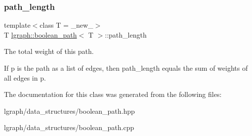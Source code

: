 \subsubsection{\texorpdfstring{path\+\_\+length}{path\_length}}
{\footnotesize\ttfamily template$<$class T = \+\_\+new\+\_\+$>$ \\
T \hyperlink{classlgraph_1_1boolean__path}{lgraph\+::boolean\+\_\+path}$<$ T $>$\+::path\+\_\+length\hspace{0.3cm}{\ttfamily [private]}}



The total weight of this path. 

If \textquotesingle{}p\textquotesingle{} is the path as a list of edges, then \textquotesingle{}path\+\_\+length\textquotesingle{} equals the sum of weights of all edges in \textquotesingle{}p\textquotesingle{}. 

The documentation for this class was generated from the following files\+:\begin{DoxyCompactItemize}
\item 
lgraph/data\+\_\+structures/boolean\+\_\+path.\+hpp\item 
lgraph/data\+\_\+structures/boolean\+\_\+path.\+cpp\end{DoxyCompactItemize}
